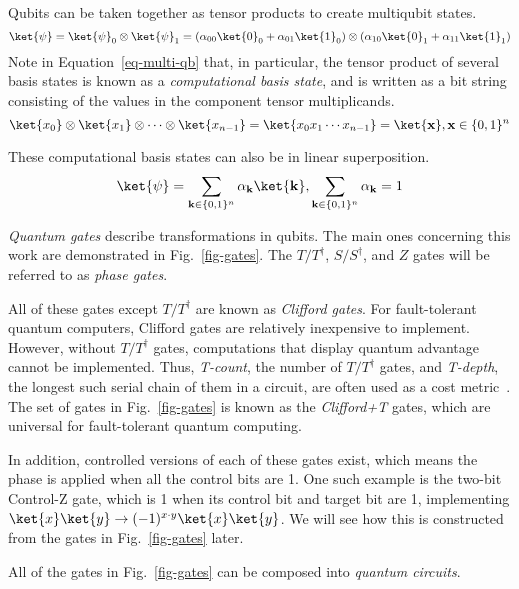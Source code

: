 Qubits can be taken together as tensor products to create multiqubit states.
\begin{equation}
\label{eq-multi-qb}
\ket{\psi} = \ket{\psi}_0 \otimes \ket{\psi}_1 =(\alpha_{00} \ket{0}_0 + \alpha_{01} \ket{1}_0) \otimes
(\alpha_{10} \ket{0}_1 + \alpha_{11} \ket{1}_1)
\end{equation}
Note in Equation~\ref{eq-multi-qb} that, in particular, the tensor product of several basis states is known as a \emph{computational basis state},
and is written as a bit string consisting of the values in the component tensor multiplicands.
\begin{equation}
\ket{x_0}\otimes\ket{x_1}\otimes\cdots\otimes\ket{x_{n-1}}=\ket{x_0 x_1 \cdots x_{n-1}}=\ket{\mathbf{x}},
\mathbf{x} \in \{0,1\}^n
\end{equation}

These computational basis states can also be in linear superposition.
\begin{equation}
\ket{\psi} = \sum_{\mathbf{k} \in \{0,1\}^n} \alpha_{\mathbf{k}}\ket{\mathbf{k}},
\sum_{\mathbf{k} \in \{0,1\}^n} \alpha_{\mathbf{k}} = 1
\end{equation}

{\it Quantum gates} describe transformations in qubits. The main ones concerning this work
are demonstrated in Fig.~\ref{fig-gates}. The $T/T^{\dagger}$, $S/S^{\dagger}$, and $Z$
gates will be referred to as {\it phase gates}.

All of these gates except $T/T^{\dagger}$ are known as {\it Clifford gates}. For
fault-tolerant quantum computers, Clifford gates are relatively inexpensive to implement.
However, without $T/T^{\dagger}$ gates, computations that display quantum advantage
cannot be implemented. Thus, {\it T-count}, the number of $T/T^{\dagger}$ gates, and
{\it T-depth}, the longest such serial chain of them in a circuit, are often used as a
cost metric~\cite{amy-meet-in-middle}. The set of gates in Fig.~\ref{fig-gates} is known
as the {\it Clifford+T} gates, which are universal for fault-tolerant quantum computing.

In addition, controlled versions of each of these gates exist, which means the phase is
applied when all the control bits are 1. One such example is the two-bit Control-Z gate,
which is 1 when its control bit and target bit are 1, implementing
$\ket{x}\ket{y} \rightarrow (-1)^{x \cdot y}\ket{x}\ket{y}$. We will see how this is
constructed from the gates in Fig.~\ref{fig-gates} later.

All of the gates in Fig.~\ref{fig-gates} can be composed into
{\it quantum circuits}.

